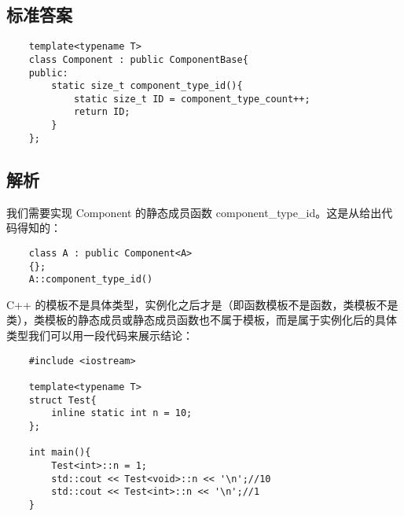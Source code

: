 

\subsection{标准答案}

\begin{verbatim}
    template<typename T>
    class Component : public ComponentBase{
    public:
        static size_t component_type_id(){
            static size_t ID = component_type_count++;
            return ID;
        }
    };
\end{verbatim}

\subsection{解析}

我们需要实现 Component 的静态成员函数 component\_type\_id。这是从给出代码得知的：

\begin{verbatim}
    class A : public Component<A>
    {};
    A::component_type_id()
\end{verbatim}

C++ 的模板不是具体类型，实例化之后才是（即函数模板不是函数，类模板不是类），类模板的静态成员或静态成员函数也不属于模板，而是属于实例化后的具体类型我们可以用一段代码来展示结论：

\begin{verbatim}
    #include <iostream>

    template<typename T>
    struct Test{
        inline static int n = 10;
    };
    
    int main(){
        Test<int>::n = 1;
        std::cout << Test<void>::n << '\n';//10
        std::cout << Test<int>::n << '\n';//1
    }
\end{verbatim}

\clearpage